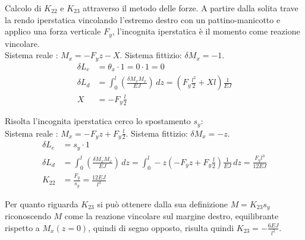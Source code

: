 \begin{esempioBox}
    Calcolo di $K_{22}$ e $K_{23}$ attraverso il metodo delle forze. A partire dalla solita trave la rendo iperstatica vincolando l'estremo destro con un pattino-manicotto  e applico una forza verticale $F_y$, l'incognita iperstatica è il momento come reazione vincolare.\\
    Sistema reale :  $M_x =-F_yz-X$. Sistema fittizio: $\delta M_x = -1$. 
    \begin{align*}
        \delta L_e &= \theta_x \cdot 1 = 0\cdot 1 = 0 \\
        \delta L_d &= \int_0^l \left(   \frac{\delta M_xM_x}{EJ}\right)\,dz 
        = \left(   F_y\frac{l^2}{2} +Xl\right)\frac{1}{EJ}\\
       X&= -F_y\frac{l}{2} 
    \end{align*}

    Risolta l'incognita iperstatica cerco lo spostamento $s_y$:\\
    Sistema reale :  $M_x =-F_yz + F_y\frac{l}{2} $. Sistema fittizio: $\delta M_x = -z$. 
    \begin{align*}
        \delta L_e &= s_y \cdot 1  \\
        \delta L_d &= \int_0^l \left(   \frac{\delta M_xM_x}{EJ}\right)\,dz 
        = \int_0^l -z\left(   -F_yz + F_y\frac{l}{2}  \right)   \frac{1}{EJ}\,dz 
        = \frac{F_y l^3}{12EJ}\\
       K_{22} &= \frac{F_y}{s_y}  = \frac{12EJ}{l^3}
    \end{align*}

    Per quanto riguarda $K_{23}$ si può ottenere dalla sua definizione $M = K_{23}s_y$ riconoscendo $M$ come la reazione vincolare sul margine destro, equilibrante rispetto a $M_x(z=0)$, quindi di segno opposto, risulta quindi $K_{23} = -\frac{6EJ}{l^2}$.
    
\end{esempioBox}